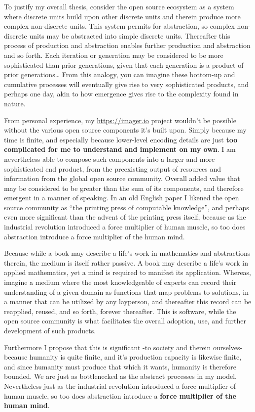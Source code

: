 To justify my overall thesis, consider the open source ecosystem as a system where discrete units build upon other discrete units and therein produce more complex non-discrete units. This system permits for abstraction, so complex non-discrete units may be abstracted into simple discrete units. Thereafter this process of production and abstraction enables further production and abstraction and so forth. Each iteration or generation may be considered to be more sophisticated than prior generations, given that each generation is a product of prior generations… From this analogy, you can imagine these bottom-up and cumulative processes will eventually give rise to very sophisticated products, and perhaps one day, akin to how emergence gives rise to the complexity found in nature.

From personal experience, my \url{https://imager.io} project wouldn’t be possible without the various open source components it’s built upon. Simply because my time is finite, and especially because lower-level encoding details are just \textbf{too complicated for me to understand and implement on my own}. I am nevertheless able to compose such components into a larger and more sophisticated end product, from the preexisting output of resources and information from the global open source community. Overall added value that may be considered to be greater than the sum of its components, and therefore emergent in a manner of speaking. In an old English paper I likened the open source community as ``the printing press of computable knowledge'', and perhaps even more significant than the advent of the printing press itself, because as the industrial revolution introduced a force multiplier of human muscle, so too does abstraction introduce a force multiplier of the human mind.

Because while a book may describe a life’s work in mathematics and abstractions therein, the medium is itself rather passive. A book may describe a life’s work in applied mathematics, yet a mind is required to manifest its application. Whereas, imagine a medium where the most knowledgeable of experts can record their understanding of a given domain as functions that map problems to solutions, in a manner that can be utilized by any layperson, and thereafter this record can be reapplied, reused, and so forth, forever thereafter. This is software, while the open source community is what facilitates the overall adoption, use, and further development of such products. 

Furthermore I propose that this is significant -to society and therein ourselves- because humanity is quite finite, and it’s production capacity is likewise finite, and since humanity must produce that which it wants, humanity is therefore bounded. We are just as bottlenecked as the abstract processes in my model. Nevertheless just as the industrial revolution introduced a force multiplier of human muscle, so too does abstraction introduce a \textbf{force multiplier of the human mind}.

